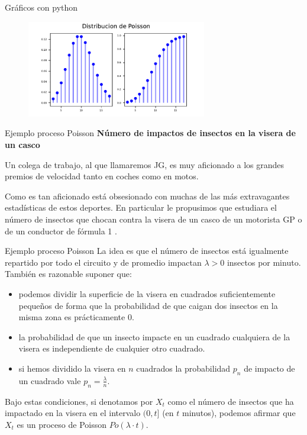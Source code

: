 \documentclass[
  ignorenonframetext,
  aspectratio=169]{beamer}
\providecommand{\tightlist}{%
  \setlength{\itemsep}{0pt}\setlength{\parskip}{0pt}}\usepackage{longtable,booktabs,array}
\begin{document}
\begin{frame}{Gráficos con python}
\protect\hypertarget{gruxe1ficos-con-python-4}{}
\begin{figure}

{\centering \includegraphics[width=0.7\textwidth,height=\textheight]{Tema_3_1_Notables_files/figure-beamer/py_poiss2_plot-1.pdf}

}

\end{figure}
\end{frame}

\begin{frame}{Ejemplo proceso Poisson}
\protect\hypertarget{ejemplo-proceso-poisson}{}
\textbf{Número de impactos de insectos en la visera de un casco}

Un colega de trabajo, al que llamaremos JG, es muy aficionado a los
grandes premios de velocidad tanto en coches como en motos.

Como es tan aficionado está obsesionado con muchas de las más
extravagantes estadísticas de estos deportes. En particular le
propusimos que estudiara el número de insectos que chocan contra la
visera de un casco de un motorista GP o de un conductor de fórmula 1 .
\end{frame}

\begin{frame}{Ejemplo proceso Poisson}
\protect\hypertarget{ejemplo-proceso-poisson-1}{}
La idea es que el número de insectos está igualmente repartido por todo
el circuito y de promedio impactan \(\lambda>0\) insectos por minuto.
También es razonable suponer que:

\begin{itemize}
\tightlist
\item
  podemos dividir la superficie de la visera en cuadrados
  suficientemente pequeños de forma que la probabilidad de que caigan
  dos insectos en la misma zona es prácticamente 0.
\item
  la probabilidad de que un insecto impacte en un cuadrado cualquiera de
  la visera es independiente de cualquier otro cuadrado.
\item
  si hemos dividido la visera en \(n\) cuadrados la probabilidad \(p_n\)
  de impacto de un cuadrado vale \(p_n=\frac{\lambda}{n}\).
\end{itemize}

Bajo estas condiciones, si denotamos por \(X_t\) como el número de
insectos que ha impactado en la visera en el intervalo \((0,t]\) (en
\(t\) minutos), podemos afirmar que \(X_t\) es un proceso de Poisson
\(Po(\lambda\cdot t)\).
\end{frame}
\end{document}
